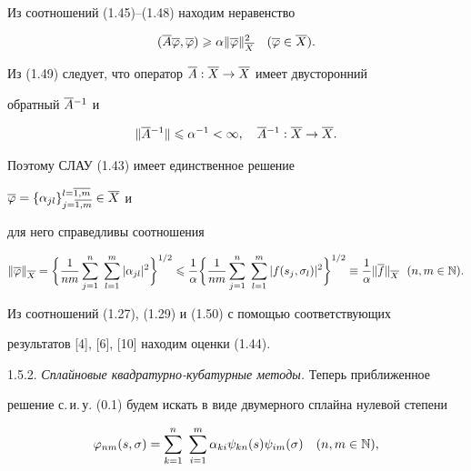 \begin{pf}
Из соотношений (1.45)--(1.48) находим неравенство


\begin{equation}


(\ol{A}\ol{\vp},\ol{\vp})\gea \alpha\|\ol{\vp}\|^2_{\ol{X}}\quad


(\ol{\vp}\in \ol{X}).


\end{equation}





Из (1.49) следует, что оператор $\overline{A}:\overline{X}\to \overline{X}$ имеет двусторонний 


обратный $\overline{A}{} ^{-1}$ и 


$$


\|\ol{A}{}^{-1}\|\lea \alpha^{-1}<\infty,\quad 


\ol{A}{}^{-1}:\ol{X}\to \ol{X}.


$$


Поэтому СЛАУ (1.43) имеет единственное решение 


$\overline{\varphi} = \{\alpha_{jl}\}_{j=\overline{1,m}}^{l=\overline{1,m}}\in \overline{X}$ и 


для него справедливы соотношения


\begin{equation}


\|\ol{\vp}\|_{\ol{X}} = \bigg\{


\frac{1}{nm}\sum_{j=1}^n\;\sum_{l=1}^m|\alpha_{jl}|^2\bigg\}^{1/2}\lea


\frac{1}{\alpha}\bigg\{


\frac{1}{nm}\sum_{j=1}^n\;\sum_{l=1}^m|f(s_j,\si_l)|^2


\bigg\}^{1/2}


\equiv \frac{1}{\alpha}\|\ol{f}\|_{\ol{X}}\ \ (n,m\in \N).


\end{equation}


Из соотношений (1.27), (1.29) и (1.50) с помощью соответствующих 


результатов [4], [6], [10] находим оценки (1.44).


\end{pf}





1.5.2. {\it Сплайновые квадратурно-кубатурные методы.} Теперь приближенное 


решение с.\,и.\,у. (0.1) будем искать в виде двумерного сплайна нулевой степени


\begin{equation}


\vp_{nm}(s,\si) = \sum_{k=1}^n\ \sum_{i=1}^m


\alpha_{ki}\psi_{kn}(s)\psi_{im}(\si) \quad (n,m\in \N),


\end{equation}


